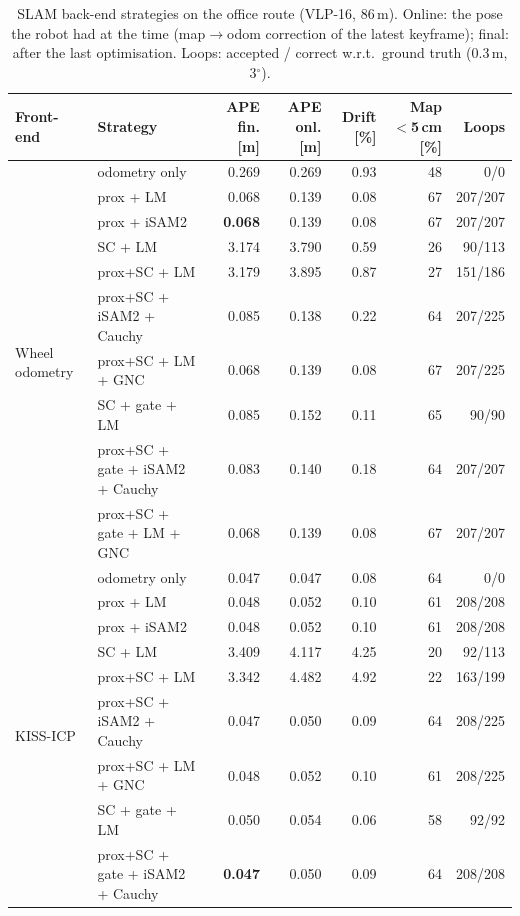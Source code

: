 \begin{table}[t]
\centering
\caption{SLAM back-end strategies on the office route (VLP-16, 86\,m). Online: the pose the robot had at the time (map$\rightarrow$odom correction of the latest keyframe); final: after the last optimisation. Loops: accepted / correct w.r.t.\ ground truth (0.3\,m, 3$^\circ$).}
\label{tab:slam}
\setlength{\tabcolsep}{3pt}
\begin{tabular}{llrrrrr}
\toprule
Front-end & Strategy & APE fin. [m] & APE onl. [m] & Drift [\%] & Map $<$5\,cm [\%] & Loops \\
\midrule
\multirow{10}{*}{Wheel odometry} & odometry only & 0.269 & 0.269 & 0.93 & 48 & 0/0 \\
 & prox + LM & 0.068 & 0.139 & 0.08 & 67 & 207/207 \\
 & prox + iSAM2 & \textbf{0.068} & 0.139 & 0.08 & 67 & 207/207 \\
 & SC + LM & 3.174 & 3.790 & 0.59 & 26 & 90/113 \\
 & prox+SC + LM & 3.179 & 3.895 & 0.87 & 27 & 151/186 \\
 & prox+SC + iSAM2 + Cauchy & 0.085 & 0.138 & 0.22 & 64 & 207/225 \\
 & prox+SC + LM + GNC & 0.068 & 0.139 & 0.08 & 67 & 207/225 \\
 & SC + gate + LM & 0.085 & 0.152 & 0.11 & 65 & 90/90 \\
 & prox+SC + gate + iSAM2 + Cauchy & 0.083 & 0.140 & 0.18 & 64 & 207/207 \\
 & prox+SC + gate + LM + GNC & 0.068 & 0.139 & 0.08 & 67 & 207/207 \\
\midrule
\multirow{10}{*}{KISS-ICP} & odometry only & 0.047 & 0.047 & 0.08 & 64 & 0/0 \\
 & prox + LM & 0.048 & 0.052 & 0.10 & 61 & 208/208 \\
 & prox + iSAM2 & 0.048 & 0.052 & 0.10 & 61 & 208/208 \\
 & SC + LM & 3.409 & 4.117 & 4.25 & 20 & 92/113 \\
 & prox+SC + LM & 3.342 & 4.482 & 4.92 & 22 & 163/199 \\
 & prox+SC + iSAM2 + Cauchy & 0.047 & 0.050 & 0.09 & 64 & 208/225 \\
 & prox+SC + LM + GNC & 0.048 & 0.052 & 0.10 & 61 & 208/225 \\
 & SC + gate + LM & 0.050 & 0.054 & 0.06 & 58 & 92/92 \\
 & prox+SC + gate + iSAM2 + Cauchy & \textbf{0.047} & 0.050 & 0.09 & 64 & 208/208 \\

\end{tabular}
\end{table}
